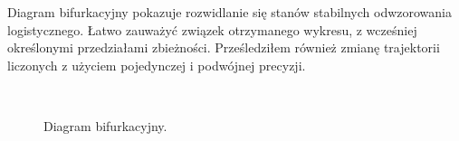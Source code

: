 \documentclass{article}
\begin{document}
        Diagram bifurkacyjny pokazuje rozwidlanie się stanów stabilnych odwzorowania logistycznego. Łatwo zauważyć związek otrzymanego wykresu, z wcześniej określonymi przedziałami zbieżności. 
        \FloatBarrier
        Prześledziłem również zmianę trajektorii liczonych z użyciem pojedynczej i podwójnej precyzji. 
        \begin{figure}[h!]
            \centering
            \\
            \caption{Diagram bifurkacyjny.}
        \end{figure}\\
        

        
    
\end{document}
